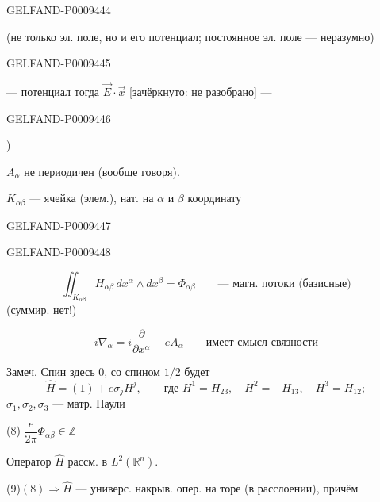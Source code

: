 \begin{GelfandAdjacentEvidence}{GELFAND-P000944}{4}


(не только эл. поле, но и его потенциал; постоянное эл. поле --- неразумно)
\end{GelfandAdjacentEvidence}
\begin{GelfandAdjacentEvidence}{GELFAND-P000944}{5}


--- потенциал тогда $\vec E\cdot\vec x$ [зачёркнуто: не разобрано] ---
\end{GelfandAdjacentEvidence}
\begin{GelfandAdjacentEvidence}{GELFAND-P000944}{6}


)

$A_\alpha$ не периодичен (вообще говоря).

$K_{\alpha\beta}$ --- ячейка (элем.), нат. на $\alpha$ и $\beta$ координату
\end{GelfandAdjacentEvidence}
\begin{GelfandAdjacentEvidence}{GELFAND-P000944}{7}

\end{GelfandAdjacentEvidence}
\begin{GelfandAdjacentEvidence}{GELFAND-P000944}{8}


\begin{equation*}
 \iint_{K_{\alpha\beta}}H_{\alpha\beta}\,dx^\alpha\wedge dx^\beta
 =\Phi_{\alpha\beta}\qquad\text{--- магн. потоки (базисные)}
 \tag{5}
\end{equation*}
(суммир. нет!)

\begin{equation*}
 i\nabla_\alpha=i\frac{\partial}{\partial x^\alpha}-eA_\alpha
 \qquad\text{имеет смысл связности}
 \tag{6}
\end{equation*}

\underline{Замеч.} Спин здесь $0$, со спином $1/2$ будет
\begin{equation*}
 \hat H=(1)+e\sigma_jH^j,\qquad\text{где }
 H^1=H_{23},\quad H^2=-H_{13},\quad H^3=H_{12};
 \tag{7}
\end{equation*}
$\sigma_1,\sigma_2,\sigma_3$ --- матр. Паули

(8)\quad{} \(\dfrac e{2\pi}\Phi_{\alpha\beta}\in\mathbb Z\)

Оператор $\hat H$ рассм. в $L^2(\mathbb R^n)$.

(9)\quad $(8)\Rightarrow\hat H$ --- универс. накрыв. опер. на торе (в расслоении), причём
\end{GelfandAdjacentEvidence}
